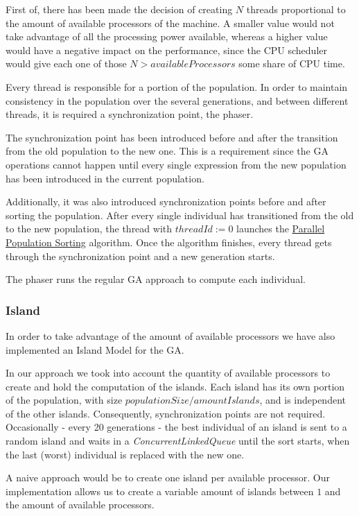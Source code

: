 \documentclass[runningheads]{llncs}
\begin{document}
First of, there has been made the decision of creating \(N\) threads proportional to the amount of available processors of the machine. A smaller value would not take advantage of all the processing power available, whereas a higher value would have a negative impact on the performance, since the CPU scheduler would give each one of those \(N > availableProcessors\) some share of CPU time.

Every thread is responsible for a portion of the population. In order to maintain consistency in the population over the several generations, and between different threads, it is required a synchronization point, the phaser. 

The synchronization point has been introduced before and after the transition from the old population to the new one. This is a requirement since the GA operations cannot happen until every single expression from the new population has been introduced in the current population.

Additionally, it was also introduced synchronization points before and after sorting the population. After every single individual has transitioned from the old to the new population, the thread with \(threadId := 0\) launches the \hyperref[subsubsec:parallelSort]{Parallel Population Sorting} algorithm. Once the algorithm finishes, every thread gets through the synchronization point and a new generation starts.

The phaser runs the regular GA approach to compute each individual.

\subsubsection{Island} \hfill \par
In order to take advantage of the amount of available processors we have also implemented an Island Model for the GA\cite{islandModelGA}.

In our approach we took into account the quantity of available processors to create and hold the computation of the islands. Each island has its own portion of the population, with size  \(populationSize / amountIslands \), and is independent of the other islands. Consequently, synchronization points are not required. Occasionally - every 20 generations - the best individual of an island is sent to a random island and waits in a \emph{ConcurrentLinkedQueue} until the sort starts, when the last (worst) individual is replaced with the new one.

A naive approach would be to create one island per available processor. Our implementation allows us to create a variable amount of islands between $1$ and the amount of available processors.
\end{document}
